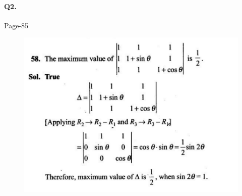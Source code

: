 \documentclass{article}
\begin{document}
\paragraph{Q2.}
\begin{flushright}
Page-85
\end{flushright}
\begin{figure}[H]
    \includegraphics[scale=0.5]{determinants_l5_ps_3.png}
\end{figure}
\end{document}

